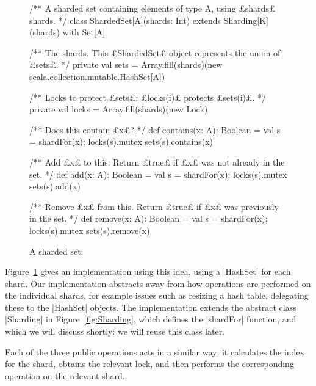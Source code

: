 \begin{figure}
\begin{scala}
/** A sharded set containing elements of type A, using £shards£ shards. */
class ShardedSet[A](shards: Int) extends Sharding[K](shards) with Set[A]{
  /** The shards.  This £ShardedSet£ object represents the union of £sets£. */ 
  private val sets = Array.fill(shards)(new scala.collection.mutable.HashSet[A])

  /** Locks to protect £sets£: £locks(i)£ protects £sets(i)£. */
  private val locks = Array.fill(shards)(new Lock)

  /** Does this contain £x£? */
  def contains(x: A): Boolean = {
    val s = shardFor(x); locks(s).mutex{ sets(s).contains(x) }
  }

  /** Add £x£ to this.  Return £true£ if £x£ was not already in the set. */
  def add(x: A): Boolean = {
    val s = shardFor(x); locks(s).mutex{ sets(s).add(x) }
  }

  /** Remove £x£ from this.  Return £true£ if £x£ was previously in the set. */
  def remove(x: A): Boolean = {
    val s = shardFor(x); locks(s).mutex{ sets(s).remove(x) }
  }
}
\end{scala}
\caption{A sharded set.}
\label{fig:ShardedSet}
\end{figure}


Figure~\ref{fig:ShardedSet} gives an implementation using this idea, using a
|HashSet| for each shard.  Our implementation abstracts away from how
operations are performed on the individual shards, for example issues such as
resizing a hash table, delegating these to the |HashSet| objects.  The
implementation extends the abstract class |Sharding| in
Figure~\ref{fig:Sharding}, which defines the |shardFor| function, and which we
will discuss shortly: we will reuse this class later.

Each of the three public operations acts in a similar way: it calculates the
index for the shard, obtains the relevant lock, and then performs the
corresponding operation on the relevant shard.  


